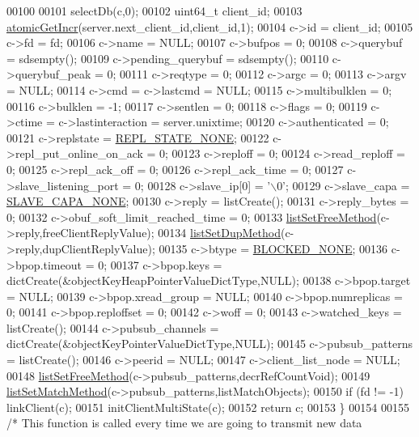 \begin{DoxyCode}
00100 
00101     selectDb(c,0);
00102     uint64\_t client\_id;
00103     \hyperlink{atomicvar_8h_a4cc5946482e11623904ce637b9b7d7fc}{atomicGetIncr}(server.next\_client\_id,client\_id,1);
00104     c->id = client\_id;
00105     c->fd = fd;
00106     c->name = NULL;
00107     c->bufpos = 0;
00108     c->querybuf = sdsempty();
00109     c->pending\_querybuf = sdsempty();
00110     c->querybuf\_peak = 0;
00111     c->reqtype = 0;
00112     c->argc = 0;
00113     c->argv = NULL;
00114     c->cmd = c->lastcmd = NULL;
00115     c->multibulklen = 0;
00116     c->bulklen = -1;
00117     c->sentlen = 0;
00118     c->flags = 0;
00119     c->ctime = c->lastinteraction = server.unixtime;
00120     c->authenticated = 0;
00121     c->replstate = \hyperlink{server_8h_a256b9506e551eaa7417f75f8fa9ed901}{REPL\_STATE\_NONE};
00122     c->repl\_put\_online\_on\_ack = 0;
00123     c->reploff = 0;
00124     c->read\_reploff = 0;
00125     c->repl\_ack\_off = 0;
00126     c->repl\_ack\_time = 0;
00127     c->slave\_listening\_port = 0;
00128     c->slave\_ip[0] = \textcolor{stringliteral}{'\(\backslash\)0'};
00129     c->slave\_capa = \hyperlink{server_8h_a3159f891b4d0af83f56eea4b2699cefc}{SLAVE\_CAPA\_NONE};
00130     c->reply = listCreate();
00131     c->reply\_bytes = 0;
00132     c->obuf\_soft\_limit\_reached\_time = 0;
00133     \hyperlink{adlist_8h_a648e4a2d20decff3182a72a608b0b8f2}{listSetFreeMethod}(c->reply,freeClientReplyValue);
00134     \hyperlink{adlist_8h_ab575839d09f454c02e06bcec5addb06b}{listSetDupMethod}(c->reply,dupClientReplyValue);
00135     c->btype = \hyperlink{server_8h_a89cf259b265c26cd1e09de67ade457dc}{BLOCKED\_NONE};
00136     c->bpop.timeout = 0;
00137     c->bpop.keys = dictCreate(&objectKeyHeapPointerValueDictType,NULL);
00138     c->bpop.target = NULL;
00139     c->bpop.xread\_group = NULL;
00140     c->bpop.numreplicas = 0;
00141     c->bpop.reploffset = 0;
00142     c->woff = 0;
00143     c->watched\_keys = listCreate();
00144     c->pubsub\_channels = dictCreate(&objectKeyPointerValueDictType,NULL);
00145     c->pubsub\_patterns = listCreate();
00146     c->peerid = NULL;
00147     c->client\_list\_node = NULL;
00148     \hyperlink{adlist_8h_a648e4a2d20decff3182a72a608b0b8f2}{listSetFreeMethod}(c->pubsub\_patterns,decrRefCountVoid);
00149     \hyperlink{adlist_8h_a3dac429a545f8def9a2bf9077eb66ddc}{listSetMatchMethod}(c->pubsub\_patterns,listMatchObjects);
00150     \textcolor{keywordflow}{if} (fd != -1) linkClient(c);
00151     initClientMultiState(c);
00152     \textcolor{keywordflow}{return} c;
00153 \}
00154 
00155 \textcolor{comment}{/* This function is called every time we are going to transmit new data}

\end{DoxyCode}
